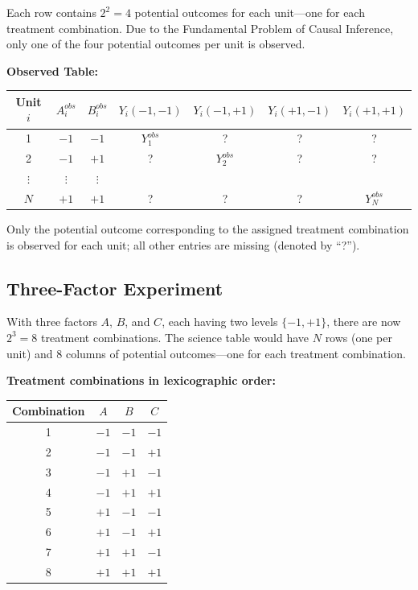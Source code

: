 \documentclass[11pt]{article}
\begin{document}
Each row contains $2^2 = 4$ potential outcomes for each unit---one for each treatment combination. Due to the Fundamental Problem of Causal Inference, only one of the four potential outcomes per unit is observed.

\textbf{Observed Table:}

\begin{center}
\begin{tabular}{c|cc|cccc}
\toprule
Unit $i$ & $A_i^{obs}$ & $B_i^{obs}$ & $Y_i(-1,-1)$ & $Y_i(-1,+1)$ & $Y_i(+1,-1)$ & $Y_i(+1,+1)$ \\
\midrule
1 & $-1$ & $-1$ & $Y_1^{obs}$ & ? & ? & ? \\
2 & $-1$ & $+1$ & ? & $Y_2^{obs}$ & ? & ? \\
$\vdots$ & $\vdots$ & $\vdots$ & & & & \\
$N$ & $+1$ & $+1$ & ? & ? & ? & $Y_N^{obs}$ \\
\bottomrule
\end{tabular}
\end{center}

Only the potential outcome corresponding to the assigned treatment combination is observed for each unit; all other entries are missing (denoted by ``?'').

\subsection*{Three-Factor Experiment}

With three factors $A$, $B$, and $C$, each having two levels $\{-1, +1\}$, there are now $2^3 = 8$ treatment combinations. The science table would have $N$ rows (one per unit) and $8$ columns of potential outcomes---one for each treatment combination.

\textbf{Treatment combinations in lexicographic order:}

\begin{center}
\begin{tabular}{c|ccc}
\toprule
Combination & $A$ & $B$ & $C$ \\
\midrule
1 & $-1$ & $-1$ & $-1$ \\
2 & $-1$ & $-1$ & $+1$ \\
3 & $-1$ & $+1$ & $-1$ \\
4 & $-1$ & $+1$ & $+1$ \\
5 & $+1$ & $-1$ & $-1$ \\
6 & $+1$ & $-1$ & $+1$ \\
7 & $+1$ & $+1$ & $-1$ \\
8 & $+1$ & $+1$ & $+1$ \\
\bottomrule
\end{tabular}
\end{center}
\end{document}
